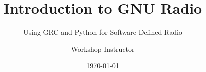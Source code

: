 \documentclass[aspectratio=169,11pt]{beamer}
\title{Introduction to GNU Radio}
\subtitle{Using GRC and Python for Software Defined Radio}
\author{Workshop Instructor}
\institute{GRCon 2025}
\date{\today}
\begin{document}
\begin{frame}
\titlepage
\end{frame}


\end{document}
